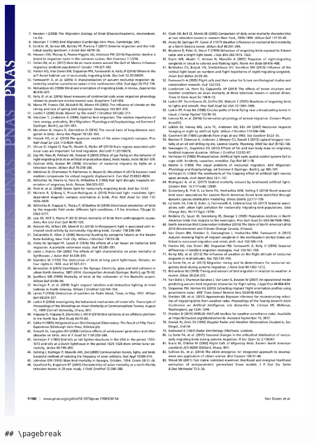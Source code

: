 \documentclass[a4paper, twoside]{templates/ociamthesis}
\begin{document}
\begin{center}\includegraphics[width=1\linewidth]{pdf_chapters/lights/lights_crop_Part6} \end{center}

\begin{verbatim}
## \pagebreak
\end{verbatim}
\end{document}
